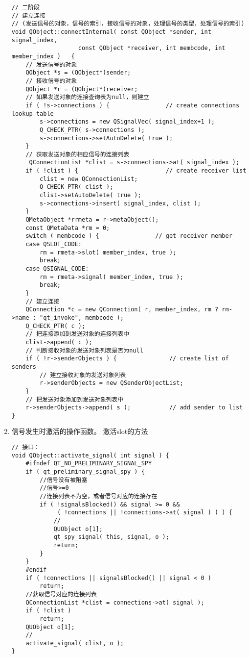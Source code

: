 \documentclass[9pt,b5paper]{article}
\begin{document}
\begin{enumerate}
\begin{lstlisting}
// 二阶段  
// 建立连接  
// (发送信号的对象，信号的索引，接收信号的对象，处理信号的类型，处理信号的索引)  
void QObject::connectInternal( const QObject *sender, int signal_index,   
			       const QObject *receiver, int membcode, int member_index )   {  
    // 发送信号的对象  
    QObject *s = (QObject*)sender;  
    // 接收信号的对象  
    QObject *r = (QObject*)receiver;  
    // 如果发送对象的连接查询表为null，则建立  
    if ( !s->connections ) {                // create connections lookup table  
	    s->connections = new QSignalVec( signal_index+1 );  
	    Q_CHECK_PTR( s->connections );  
	    s->connections->setAutoDelete( true );  
    }  
    // 获取发送对象的相应信号的连接列表  
     QConnectionList *clist = s->connections->at( signal_index );  
    if ( !clist ) {                         // create receiver list  
	    clist = new QConnectionList;  
	    Q_CHECK_PTR( clist );  
	    clist->setAutoDelete( true );  
	    s->connections->insert( signal_index, clist );  
    }  
    QMetaObject *rrmeta = r->metaObject();  
    const QMetaData *rm = 0;  
    switch ( membcode ) {                // get receiver member  
    case QSLOT_CODE:  
	    rm = rmeta->slot( member_index, true );  
	    break;  
    case QSIGNAL_CODE:  
	    rm = rmeta->signal( member_index, true );  
	    break;  
    }  
    // 建立连接  
    QConnection *c = new QConnection( r, member_index, rm ? rm->name : "qt_invoke", membcode );  
    Q_CHECK_PTR( c );  
    // 把连接添加到发送对象的连接列表中  
    clist->append( c );  
    // 判断接收对象的发送对象列表是否为null  
    if ( !r->senderObjects ) {               // create list of senders 
	    // 建立接收对象的发送对象列表  
	    r->senderObjects = new QSenderObjectList;  
    }  
    // 把发送对象添加到发送对象列表中  
    r->senderObjects->append( s );           // add sender to list  
}
\end{lstlisting}
\item 信号发生时激活的操作函数。 激活slot的方法
\label{sec-4-2-1-3}
\lstset{language=java,label= ,caption= ,numbers=none}
\begin{lstlisting}
// 接口：
void QObject::activate_signal( int signal ) {  
    #ifndef QT_NO_PRELIMINARY_SIGNAL_SPY  
    if ( qt_preliminary_signal_spy ) {  
	    //信号没有被阻塞  
	    //信号>=0  
	    //连接列表不为空，或者信号对应的连接存在  
	    if ( !signalsBlocked() && signal >= 0 &&  
		     ( !connections || !connections->at( signal ) ) ) {  
		    //  
		    QUObject o[1];  
		    qt_spy_signal( this, signal, o );  
		    return;  
	    }  
    }  
    #endif  
    if ( !connections || signalsBlocked() || signal < 0 )  
	    return;  
    //获取信号对应的连接列表  
    QConnectionList *clist = connections->at( signal );  
    if ( !clist )  
	    return;  
    QUObject o[1];  
    //  
    activate_signal( clist, o );  
}  


\end{lstlisting}
\end{enumerate}
\end{document}
